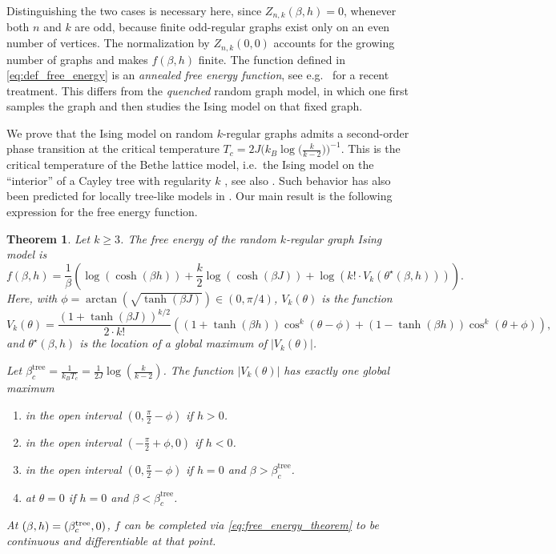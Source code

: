 \documentclass{article}
\newtheorem{theorem}{Theorem}
\numberwithin{theorem}{section}
\theoremstyle{remark}
\begin{document}
Distinguishing the two cases is necessary here, since $Z_{n,k}(\beta, h) =0$, whenever both $n$ and $k$ are odd, because finite odd-regular graphs exist only on an even number of vertices. The normalization by $Z_{n,k}(0,0)$ accounts for the growing number of graphs and makes $f(\beta,h)$ finite. The function defined in \eqref{eq:def_free_energy} is an \emph{annealed free energy function}, see e.g.\ \cite{FixedMagnetization} for a recent treatment. This differs from the \emph{quenched} random graph model, in which one first samples the graph and then studies the Ising model on that fixed graph.\par  

We prove that the Ising model on random $k$-regular graphs admits a second-order phase transition at the critical temperature $T_c = 2J \big( k_B \log\big(\tfrac{k}{k-2}\big) \big)^{-1}.$
This is the critical temperature of the Bethe lattice model, i.e.\ the Ising model on the ``interior'' of a Cayley tree with regularity $k$ \cite{Chen1974Hopping}, see also \cite[\S 4]{baxter1982exactly}. Such behavior has also been predicted for locally tree-like models in \cite{dommers2014ising}.
Our main result is the following expression for the free energy function.

\begin{theorem}
  \label{thm:free_energy}
  Let $k\geq 3$. The free energy of the random $k$-regular graph Ising model is
  \begin{equation}
    \label{eq:free_energy_theorem}
    f(\beta,h) = \frac{1}{\beta} \left( \log(\cosh(\beta h))+ \frac{k}{2}\log(\cosh(\beta J)) +  \log(k! \cdot V_k(\theta^\star(\beta,h))) \right).
  \end{equation}
  Here, with 
  $\phi = \arctan\left( \sqrt{\tanh(\beta J)} \right) \in (0,\pi/4)$,
$V_k(\theta)$ is the function
  \begin{equation*}
    V_k(\theta) = \frac{(1+\tanh(\beta J))^{k/2}}{2 \cdot k!}\left( (1+\tanh(\beta h))\cos^k(\theta - \phi) + (1-\tanh(\beta h))\cos^k(\theta + \phi) \right),
  \end{equation*}
and $\theta^\star(\beta,h)$ is the location of a global maximum of $|V_k(\theta)|$.

Let $\beta_c^{\mathrm{tree}} = \frac{1}{k_B T_c}= \frac{1}{2J}\log(\frac{k}{k-2})$.
The function $|V_k(\theta)|$ has exactly one global maximum
\begin{enumerate}
\item in the open interval $(0,\frac{\pi}{2}-\phi)$ if $h > 0$.
\item in the open interval $(-\frac{\pi}{2}+\phi,0)$ if $h < 0$.
\item in the open interval $(0,\frac{\pi}{2}-\phi)$ if $h =0$ and $\beta > \beta_c^{\mathrm{tree}}$.
\item at $\theta = 0$ if $h=0$ and $\beta < \beta_c^{\mathrm{tree}}$.
\end{enumerate}
At $(\beta, h) = (\beta_c^{\rm tree}, 0)$, $f$ can be completed via \eqref{eq:free_energy_theorem} to be continuous and differentiable at that point.
\end{theorem}
\end{document}
